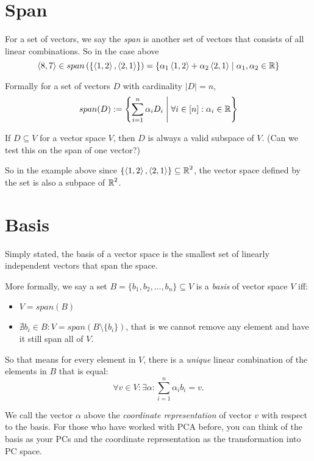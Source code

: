 \section{Span}
For a set of vectors, we say the \emph{span} is another set of vectors that consists of all linear combinations. 
So in the case above
\[
\left\langle8,7\right\rangle \in span\left(\left\{\left\langle1,2\right\rangle,\left\langle2,1\right\rangle\right\}\right) = 
\left\{\alpha_1\left\langle1,2\right\rangle + \alpha_2\left\langle2,1\right\rangle \;\middle|\; \alpha_1,\alpha_2 \in \operatorname{\mathbb{R}}\right\}
\]

Formally for a set of vectors $D$ with cardinality $\left|D\right|=n$, 
\[
span(D) := \left\{\sum_{i=1}^{n} \alpha_iD_i \;\middle|\; \forall i \in \left[n\right]: \alpha_i \in \operatorname{\mathbb{R}} \right\}
\]

If $D\subseteq V$ for a vector space $V$, then $D$ is always a valid subspace of $V$. 
(Can we test this on the span of one vector?)

So in the example above since $\left\{\left\langle1,2\right\rangle,\left\langle2,1\right\rangle\right\}\subseteq\operatorname{\mathbb{R}}^2$,
the vector space defined by the set is also a subpace of $\operatorname{\mathbb{R}}^2$. 

\section{Basis}
Simply stated, the basis of a vector space is the smallest set of linearly independent vectors that span the space. 

More formally, we say a set $B=\{b_1,b_2,...,b_n\} \subseteq V$ is a \emph{basis} of vector space $V$ iff:
\begin{itemize}
\item $V = span(B)$
\item $\nexists b_i\in B : V = span(B\setminus\{b_i\})$, that is we cannot remove any element and have it still span all of $V$.
\end{itemize}

So that means for every element in $V$, there is a \textit{unique} linear combination of the elements in $B$ that is equal:
\[\forall v \in V : \exists \alpha : \sum_{i=1}^n \alpha_ib_i = v.\]

We call the vector $\alpha$ above the \emph{coordinate representation} of vector $v$ with respect to the basis. 
For those who have worked with PCA before, you can think of the basis as your PCs and the coordinate representation as the transformation into PC space. 

